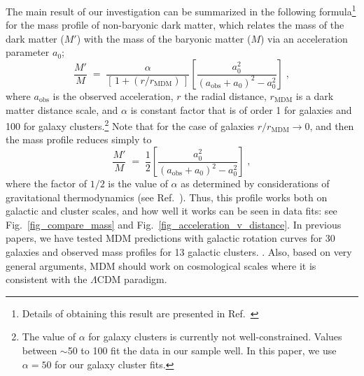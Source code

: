 \documentclass{bjp}
\begin{document}
The main result of our investigation can be summarized in the following formula\footnote{Details of obtaining this result are presented in Ref.~} for the mass profile of non-baryonic dark matter,
 which relates the mass of the dark matter ($M'$) with the mass of the baryonic matter ($M$) via an acceleration parameter $a_0$;
%
\begin{equation}
\label{clustermasspintro}
\dfrac{M'}{M}
\;=\; \dfrac{\alpha}{\left[\,1+ 
\left(r/r_\mathrm{MDM}\right)\,\right]}\left[\dfrac{a_0^2}{(a_\mathrm{obs}+a_0)^2 - a_0^2}\right]
\;,
\end{equation}
%
where $a_\mathrm{obs}$ is the observed acceleration, $r$ the radial distance, $r_\mathrm{MDM}$ is a dark matter distance scale, and $\alpha$ is constant factor that is of order 1 for galaxies and 100 for galaxy clusters.\footnote{The value of $\alpha$ for galaxy clusters is currently not well-constrained. Values between $\sim$50 to 100 fit the data in our sample well. In this paper, we use $\alpha=50$ for our galaxy cluster fits.}
Note that for the case of galaxies $r/r_\mathrm{MDM} \to 0$, and then the mass profile reduces simply to
%
\begin{equation}
\dfrac{M'}{M}
\;=\; 
\dfrac{1}{2}\left[\dfrac{a_0^2}{(a_\mathrm{obs}+a_0)^2 - a_0^2}\right]
\;,
\end{equation}
%
where the factor of $1/2$ is the value of $\alpha$ as determined by considerations of gravitational thermodynamics (see Ref.~). Thus, this profile works both on galactic and cluster scales, and how well it works can be seen in data fits: see Fig.~\ref{fig_compare_mass} and Fig.~\ref{fig_acceleration_v_distance}. 
In previous papers, we have tested MDM predictions
with galactic rotation curves for 30 galaxies and observed mass profiles 
for 13 galactic clusters. \cite{Edmonds:2013hba,Edmonds:2016tio,Edmonds:2017zhg}. Also, based on very general arguments, MDM should work on cosmological scales where it is
consistent with the $\Lambda$CDM paradigm.\cite{Ho:2010ca}
\end{document}
